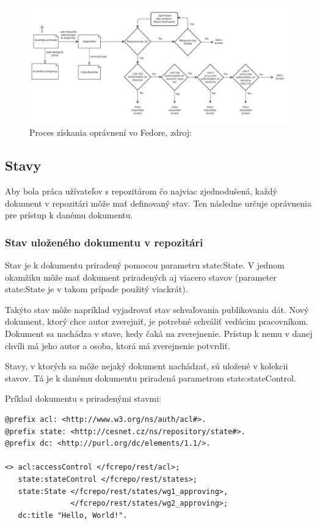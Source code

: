 \documentclass[thesis=M,slovak]{FITthesis}[2013/05/06]
\begin{document}
\begin{figure}\centering
	\includegraphics[width=1.0\textwidth]{stavy/ACLFedoraFlow.png}
 	\caption[Proces získania oprávnení vo Fedore]{Proces získania oprávnení vo Fedore, zdroj: \cite{FedoraACL}}\label{graphics:ACLFedoraFlow}
\end{figure}

\subsection{Stavy}
Aby bola práca užívateľov s repozitárom čo najviac zjednodušená, každý dokument v repozitári môže mať definovaný stav. Ten následne určuje oprávnenia pre prístup k danému dokumentu.

\subsubsection{Stav uloženého dokumentu v repozitári}
Stav je k dokumentu priradený pomocou parametru state:State. V jednom okamžiku môže mať dokument priradených aj viacero stavov (parameter state:State je v takom prípade použitý viackrát).

Takýto stav môže napríklad vyjadrovať stav schvaľovania publikovania dát. Nový dokument, ktorý chce autor zverejniť, je potrebné schváliť vedúcim pracovníkom. Dokument sa nachádza v stave, kedy čaká na zverejnenie. Prístup k nemu v danej chvíli má jeho autor a osoba, ktorá má zverejnenie potvrdiť.

Stavy, v ktorých sa môže nejaký dokument nachádzať, sú uložené v kolekcii stavov. Tá je k danému dokumentu priradená parametrom state:stateControl.

Príklad dokumentu s priradenými stavmi:
\begin{lstlisting}[frame=single] 
@prefix acl: <http://www.w3.org/ns/auth/acl#>.
@prefix state: <http://cesnet.cz/ns/repository/state#>.
@prefix dc: <http://purl.org/dc/elements/1.1/>.

<> acl:accessControl </fcrepo/rest/acl>;
   state:stateControl </fcrepo/rest/states>;
   state:State </fcrepo/rest/states/wg1_approving>,
               </fcrepo/rest/states/wg2_approving>;
   dc:title "Hello, World!".
\end{lstlisting}
\end{document}
